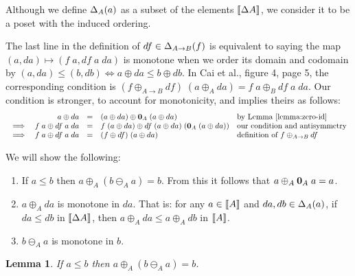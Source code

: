\documentclass{article}
\theoremstyle{plain}
\newtheorem{lemma}{Lemma}
\theoremstyle{definition}
\begin{document}
Although we define $\Delta_{A}({a})$ as a subset of the elements ${\llbracket{\Delta{A}}\rrbracket}$,
we consider it to be a poset with the induced ordering.

The last line in the definition of $df \in \Delta_{A \to B}({f})$ is equivalent to
saying the map $(a, da) \mapsto (f\;a, df\;a\;da)$ is monotone when we order its
domain and codomain by $(a,da) \le (b,db) \iff a \oplus da \le b \oplus db$.
%
In Cai et al., figure 4, page 5, the corresponding condition is
$(f \oplus_{A \to B} df)\; (a \oplus_A da) = f\;a \oplus_B df\;a\;da$.
%
Our condition is stronger, to account for monotonicity, and implies theirs as follows:
\[\begin{array}{crcll}
  & a \oplus da &=& (a \oplus da) \oplus \mathbf{0}_A \;(a \oplus da)
  & \text{by Lemma \ref{lemma:zero-id}}\\
  \implies& f\;a \oplus df\;a\;da &=&
  f\;(a \oplus da) \oplus df \;(a \oplus da) \;(\mathbf{0}_A \;(a \oplus da))
  & \text{our condition and antisymmetry}\\
  \implies& f\;a \oplus df\;a\;da &=& (f \oplus df) \; (a \oplus da)
  & \text{definition of $f \oplus_{A \to B} df$}
\end{array}\]

We will show the following:

\begin{enumerate}
\item If $a \le b$ then $a \oplus_A (b \ominus_A a) = b$. From this it
  follows that $a \oplus_A \mathbf{0}_A\; a = a$.

\item {} $a \oplus_A da$ is monotone in $da$. That is: for
  any $a \in {\llbracket{A}\rrbracket}$ and $da, db \in \Delta_{A}({a})$, if $da \le db$ in
  ${\llbracket{\Delta{A}}\rrbracket}$, then $a \oplus_A da \le a \oplus_A db$ in ${\llbracket{A}\rrbracket}$.

\item {} $b \ominus_A a$ is monotone in $b$.
\end{enumerate}



\begin{lemma}
  \label{lemma:oplus-ominus}
  \label{lemma:zero-id}
  If $a \le b$ then $a \oplus_A (b \ominus_A a) = b$.
\end{lemma}
\end{document}
